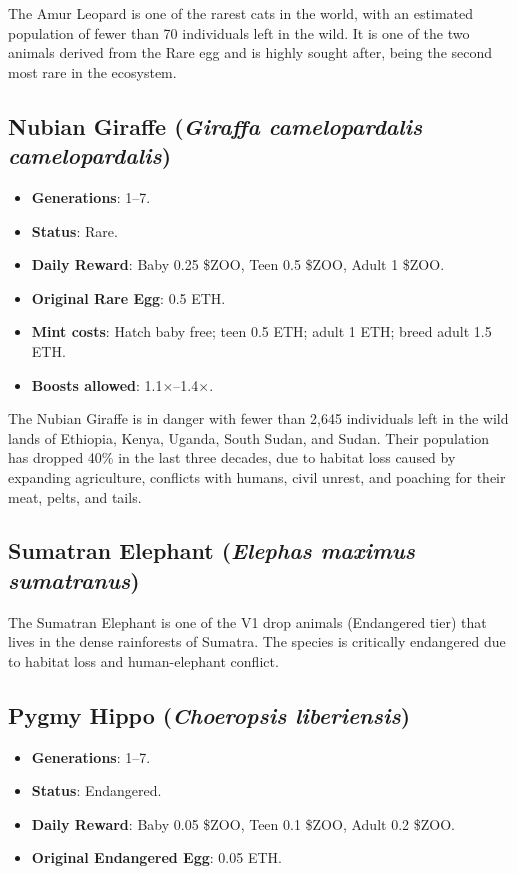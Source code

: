 The Amur Leopard is one of the rarest cats in the world, with an estimated population of fewer than 70 individuals left in the wild. It is one of the two animals derived from the Rare egg and is highly sought after, being the second most rare in the ecosystem.

\subsection{Nubian Giraffe (\textit{Giraffa camelopardalis camelopardalis})}

\begin{itemize}
  \item \textbf{Generations}: 1--7.
  \item \textbf{Status}: Rare.
  \item \textbf{Daily Reward}: Baby 0.25 \$ZOO, Teen 0.5 \$ZOO, Adult 1 \$ZOO.
  \item \textbf{Original Rare Egg}: 0.5 ETH.
  \item \textbf{Mint costs}: Hatch baby free; teen 0.5 ETH; adult 1 ETH; breed adult 1.5 ETH.
  \item \textbf{Boosts allowed}: 1.1$\times$--1.4$\times$.
\end{itemize}

The Nubian Giraffe is in danger with fewer than 2{,}645 individuals left in the wild lands of Ethiopia, Kenya, Uganda, South Sudan, and Sudan. Their population has dropped 40\% in the last three decades, due to habitat loss caused by expanding agriculture, conflicts with humans, civil unrest, and poaching for their meat, pelts, and tails.

\subsection{Sumatran Elephant (\textit{Elephas maximus sumatranus})}

The Sumatran Elephant is one of the V1 drop animals (Endangered tier) that lives in the dense rainforests of Sumatra. The species is critically endangered due to habitat loss and human-elephant conflict.

\subsection{Pygmy Hippo (\textit{Choeropsis liberiensis})}

\begin{itemize}
  \item \textbf{Generations}: 1--7.
  \item \textbf{Status}: Endangered.
  \item \textbf{Daily Reward}: Baby 0.05 \$ZOO, Teen 0.1 \$ZOO, Adult 0.2 \$ZOO.
  \item \textbf{Original Endangered Egg}: 0.05 ETH.
\end{itemize}

